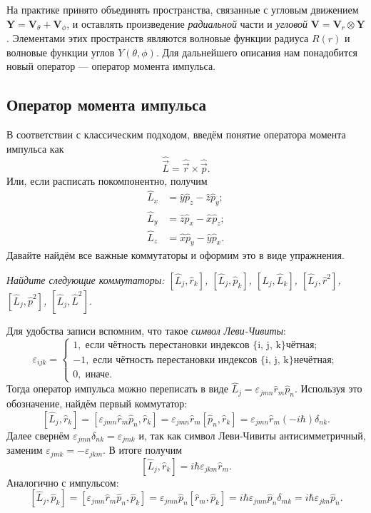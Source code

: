 На практике принято объединять пространства, связанные с угловым движением
$\mathbf{Y} = \mathbf{V}_{\theta} + \mathbf{V}_{\phi}$, и оставлять
произведение \textit{радиальной} части и \textit{угловой} $\mathbf{V} =
  \mathbf{V}_r \otimes \mathbf{Y}$. Элементами этих пространств являются волновые
функции радиуса $R(r)$ и волновые функции углов $Y(\theta, \phi)$. Для
дальнейшего описания нам понадобится новый оператор --- оператор момента
импульса.
\subsection{Оператор момента импульса}
В соответствии с классическим подходом, введём понятие оператора момента
импульса как
\[
  \hat{\Vec{L}} = \hat{\Vec{r}} \times \hat{\Vec{p}}.
\]
Или, если расписать покомпонентно, получим
\begin{align*}
  \hat{L}_x &= \hat{y}\hat{p}_z - \hat{z}\hat{p}_y;\\
  \hat{L}_y &= \hat{z}\hat{p}_x - \hat{x}\hat{p}_z;\\
  \hat{L}_z &= \hat{x}\hat{p}_y - \hat{y}\hat{p}_x.
\end{align*}
Давайте найдём все важные коммутаторы и оформим это в виде упражнения.
\begin{exercise}
  \textit{Найдите следующие коммутаторы: $[\hat{L}_j, \hat{r}_k]$, $[\hat{L}_j,
        \hat{p}_k]$, $[\hat{L}_j, \hat{L}_k]$, $[\hat{L}_j, \hat{r}^2]$, $[\hat{L}_j,
        \hat{p}^2]$, $[\hat{L}_j, \hat{L}^2]$.}
\end{exercise}

Для удобства записи вспомним, что такое \textit{символ Леви-Чивиты}:
\[
  \varepsilon_{ijk} =
  \begin{cases}
    1,\; \text{если чётность перестановки индексов \{i, j, k\} чётная};\\
    -1,\;\text{если чётность перестановки индексов \{i, j, k\} нечётная}; \\
    0,\;\text{иначе}.
  \end{cases}
\]
Тогда оператор импульса можно переписать в виде $\hat{L}_j = \varepsilon_{jmn}
  \hat{r}_m \hat{p}_n$. Используя это обозначение, найдём первый коммутатор:
\[
  \left[\hat{L}_j, \hat{r}_k\right] = [\varepsilon_{jmn} \hat{r}_m \hat{p}_n, \hat{r}_k] = \varepsilon_{jmn} \hat{r}_m [\hat{p}_n, \hat{r}_k] = \varepsilon_{jmn}\hat{r}_m(-i\hbar)\delta_{nk}.
\]
Далее свернём $\varepsilon_{jmn}\delta_{nk} = \varepsilon_{jmk}$ и, так как
символ Леви-Чивиты антисимметричный, заменим $\varepsilon_{jmk} =
  -\varepsilon_{jkm}$. В итоге получим
\[
  \left[\hat{L}_j, \hat{r}_k\right] = i\hbar\varepsilon_{jkm}\hat{r}_m.
\]
Аналогично с импульсом:
\[
  \left[\hat{L}_j, \hat{p}_k\right] = [\varepsilon_{jmn} \hat{r}_m \hat{p}_n, \hat{p}_k] = \varepsilon_{jmn} \hat{p}_n [\hat{r}_m, \hat{p}_k] = i\hbar\varepsilon_{jmn}\hat{p}_n\delta_{mk} = i\hbar\varepsilon_{jkn}\hat{p}_n.
\]

